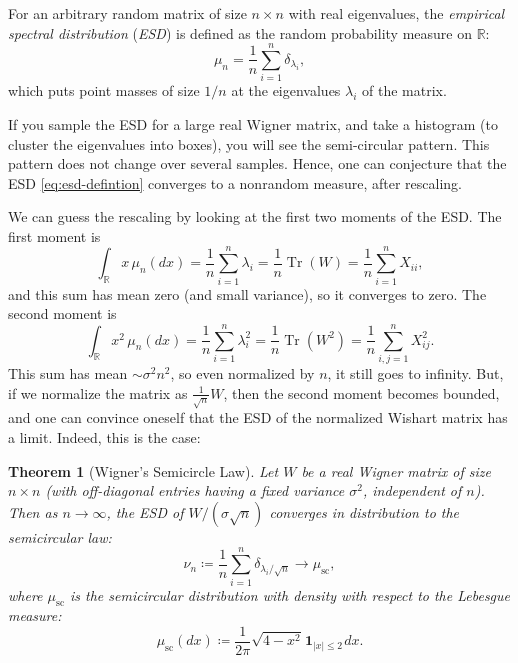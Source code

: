 \documentclass[letterpaper,11pt,oneside,reqno]{article}
\numberwithin{equation}{section}
\newcommand{\ssp}{\hspace{1pt}}
\newtheorem{theorem}[proposition]{Theorem}
\theoremstyle{definition}
\begin{document}
For an arbitrary random matrix of size $n\times n$ with real eigenvalues,
the \emph{empirical spectral distribution} (\emph{ESD}) is defined as the
random probability measure on $\mathbb{R}$:
\begin{equation}
	\label{eq:esd-defintion}
	\mu_n = \frac{1}{n} \sum_{i=1}^n \delta_{\lambda_i},
\end{equation}
which puts point masses of size $1/n$ at the eigenvalues $\lambda_i$ of the matrix.

If you sample the ESD for a large real Wigner matrix,
and take a histogram (to cluster the eigenvalues into boxes),
you will see the semi-circular pattern. This pattern
does not change over several samples. Hence, one can
conjecture that the
ESD \eqref{eq:esd-defintion} converges to a nonrandom
measure, after rescaling.

We can guess the rescaling by looking at the first two moments of the ESD.
The first moment is
\begin{equation}
	\label{eq:first-moment-esd}
	\int_{\mathbb{R}} x \, \mu_n(dx) = \frac{1}{n} \sum_{i=1}^n \lambda_i=
	\frac{1}{n} \operatorname{Tr}(W) =
	\frac{1}{n}\sum_{i=1}^n X_{ii},
\end{equation}
and this sum has mean zero (and small variance), so it converges to zero.
The second moment is
\begin{equation}
	\label{eq:second-moment-esd}
	\int_{\mathbb{R}} x^2 \, \mu_n(dx) = \frac{1}{n} \sum_{i=1}^n \lambda_i^2=
	\frac{1}{n} \operatorname{Tr}(W^2) =
	\frac{1}{n}
	\sum_{i,j=1}^n X_{ij}^2.
\end{equation}
This sum has mean $\sim \sigma^2 n^2$, so even normalized by $n$,
it still goes to infinity.
But, if we normalize the matrix as $\frac{1}{\sqrt n}W$,
then the second moment
becomes bounded, and one can convince oneself that the
ESD of the normalized Wishart matrix has a limit.
Indeed, this is the case:

\begin{theorem}[Wigner's Semicircle Law]
	\label{thm:esd-semicircle}
	Let $W$ be a real Wigner matrix of size $n\times n$
	(with off-diagonal entries having a fixed variance $\sigma^2$, independent of $n$).
	Then
	as $n\to\infty$,
	the ESD of $W/(\sigma\sqrt{n})$ converges in distribution to the semicircular law:
	\begin{equation}
		\label{eq:thm-esd-semicircle}
		\nu_n\coloneqq \frac{1}{n}\sum_{i=1}^{n}\delta_{\lambda_i/\sqrt{n}}
		\longrightarrow \mu_{\mathrm{sc}},
	\end{equation}
	where $\mu_{\mathrm{sc}}$ is the semicircular distribution with density
	with respect to the Lebesgue measure:
	\begin{equation}
		\label{eq:semicircle-density-defintion}
		\mu_{\mathrm{sc}}(dx) \coloneqq \frac{1}{2\pi} \sqrt{4-x^2} \ssp \mathbf{1}_{|x| \leq 2}\ssp
		dx.
	\end{equation}
\end{theorem}
\end{document}
